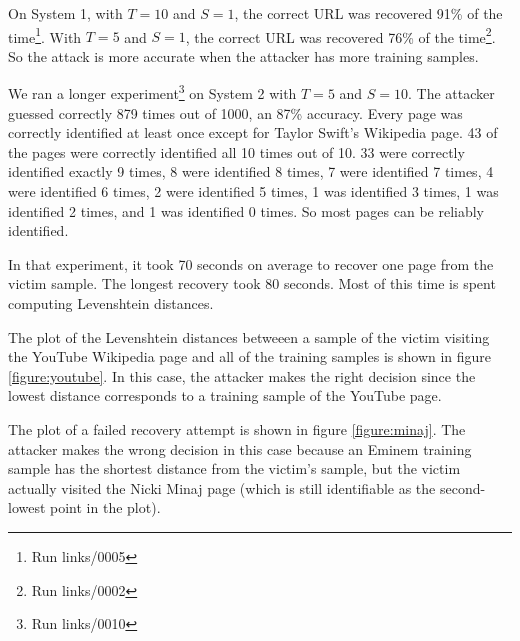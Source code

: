 \documentclass{acm_proc_article-sp}
\begin{document}
On System 1, with $T=10$ and $S=1$, the correct URL was recovered 91\% of the
time\footnote{Run links/0005}. With $T=5$ and $S=1$, the correct URL was
recovered 76\% of the time\footnote{Run links/0002}. So the attack is more
accurate when the attacker has more training samples.

We ran a longer experiment\footnote{Run links/0010} on System 2 with $T=5$ and
$S=10$. The attacker guessed correctly 879 times out of 1000, an 87\% accuracy.
Every page was correctly identified at least once except for Taylor Swift's
Wikipedia page. 43 of the pages were correctly identified all 10 times out of
10. 33 were correctly identified exactly 9 times, 8 were identified 8 times,
7 were identified 7 times, 4 were identified 6 times, 2 were identified 5 times,
1 was identified 3 times, 1 was identified 2 times, and 1 was identified
0 times. So most pages can be reliably identified.

In that experiment, it took 70 seconds on average to recover one page from the
victim sample. The longest recovery took 80 seconds. Most of this time is spent
computing Levenshtein distances.

The plot of the Levenshtein distances betweeen a sample of the victim visiting
the YouTube Wikipedia page and all of the training samples is shown in figure
\ref{figure:youtube}. In this case, the attacker makes the right decision since
the lowest distance corresponds to a training sample of the YouTube page.

The plot of a failed recovery attempt is shown in figure \ref{figure:minaj}. The
attacker makes the wrong decision in this case because an Eminem training sample
has the shortest distance from the victim's sample, but the victim actually
visited the Nicki Minaj page (which is still identifiable as the second-lowest
point in the plot).

\begin{figure*}
    \label{figure:youtube}
    \centering
    
    \caption{A successful recovery. The Levenshtein distance between the
    training samples and a recording of the victim visiting the YouTube
    Wikipedia page. The shortest distance is visible at mark 68 on the page axis
which corresponds to a YouTube training sample. The outlier at mark 29
corresponds to a disambiguation page that has a different format from the usual
Wikipedia page. The order on the page axis is not meaningful.}
\end{figure*}

\begin{figure*}
    \label{figure:minaj}
    \centering
    
    \caption{A failed recovery. The Levenshtein distance between the training samples and
        a recording of the victim visiting the Nicki Minaj Wikipedia page. The
    shortest distance (97 on the page axis) corresponds to a training sample of
the Eminem Wikipedia page. The Nicki Minaj training samples still stand out (55
on the page axis). The order on the page axis is not meaningful. Distances above
500 are not shown.}
\end{figure*}
\end{document}
